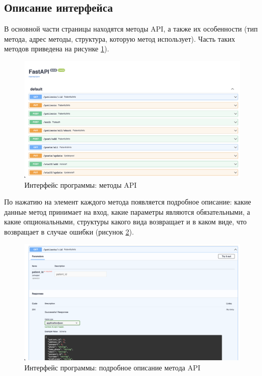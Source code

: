\subsection{Описание интерфейса}

В основной части страницы находятся методы API, а также их особенности (тип метода, адрес методы, структура, которую метод использует). Часть таких методов приведена на рисунке \ref{fig:interface-1}). 
\begin{figure}[h]
	\centering
	\captionsetup{justification=centering}
	\includegraphics[width=170mm]{img/interface.png}
	\caption{Интерфейс программы: методы API}
	\label{fig:interface-1}
\end{figure}

По нажатию на элемент каждого метода появляется подробное описание: какие данные метод принимает на вход, какие параметры являются обязательными, а какие опциональными, структуры какого вида возвращает и в каком виде, что возвращает в случае ошибки (рисунок \ref{fig:interface-2}).
\begin{figure}[h]
	\centering
	\captionsetup{justification=centering}
	\includegraphics[width=170mm]{img/interface-2.png}
	\caption{Интерфейс программы: подробное описание метода API}
	\label{fig:interface-2}
\end{figure}


